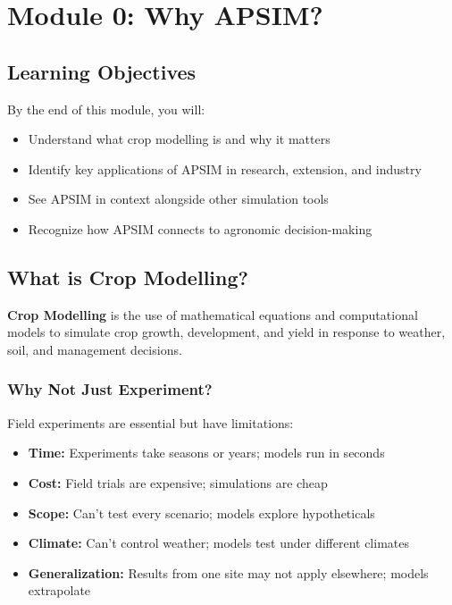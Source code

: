 
\chapter{Module 0: Why APSIM?}
\label{ch:module0}

\section{Learning Objectives}

By the end of this module, you will:
\begin{itemize}
  \item Understand what crop modelling is and why it matters
  \item Identify key applications of APSIM in research, extension, and industry
  \item See APSIM in context alongside other simulation tools
  \item Recognize how APSIM connects to agronomic decision-making
\end{itemize}

\section{What is Crop Modelling?}

\begin{keyconceptbox}
\textbf{Crop Modelling} is the use of mathematical equations and computational models to simulate crop growth, development, and yield in response to weather, soil, and management decisions.
\end{keyconceptbox}

\subsection{Why Not Just Experiment?}

Field experiments are essential but have limitations:
\begin{itemize}
  \item \textbf{Time:} Experiments take seasons or years; models run in seconds
  \item \textbf{Cost:} Field trials are expensive; simulations are cheap
  \item \textbf{Scope:} Can't test every scenario; models explore hypotheticals
  \item \textbf{Climate:} Can't control weather; models test under different climates
  \item \textbf{Generalization:} Results from one site may not apply elsewhere; models extrapolate
\end{itemize}

